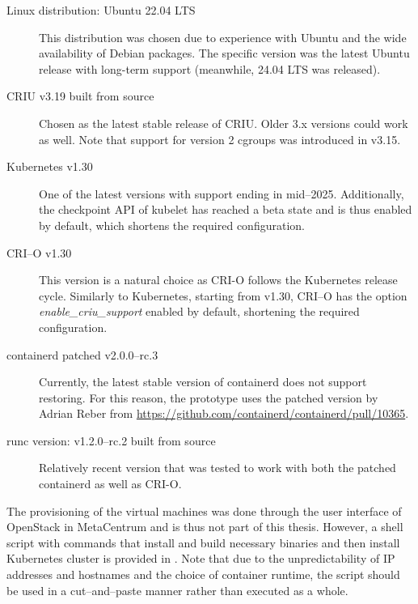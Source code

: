\documentclass[
  digital,     %
  oneside,     %
  nosansbold,  %
  nocolorbold, %
  lof,         %
  nolot,         %
]{fithesis4}
\begin{document}
\begin{description}
    \item[Linux distribution: Ubuntu 22.04 LTS] This distribution was chosen due to experience with Ubuntu and the wide availability of Debian packages. The specific version was the latest Ubuntu release with long-term support (meanwhile, 24.04 LTS was released).
    
    \item[CRIU v3.19 built from source] Chosen as the latest stable release of CRIU. Older 3.x versions could work as well. Note that support for version 2 cgroups was introduced in v3.15.
    
    \item[Kubernetes v1.30] One of the latest versions with support ending in mid--2025. Additionally, the checkpoint API of kubelet has reached a beta state and is thus enabled by default, which shortens the required configuration.

    \item[CRI--O v1.30] This version is a natural choice as CRI-O follows the Kubernetes release cycle. Similarly to Kubernetes, starting from v1.30, CRI--O has the option \emph{enable\_criu\_support} enabled by default, shortening the required configuration.
        
    \item[containerd patched v2.0.0--rc.3] Currently, the latest stable version of containerd does not support restoring. For this reason, the prototype uses the patched version by Adrian Reber from \url{https://github.com/containerd/containerd/pull/10365}.

    \item[runc version: v1.2.0--rc.2 built from source] Relatively recent version that was tested to work with both the patched containerd as well as CRI-O. %

\end{description}

The provisioning of the virtual machines was done through the user interface of OpenStack in MetaCentrum and is thus not part of this thesis. However, a shell script with commands that install and build necessary binaries and then install Kubernetes cluster is provided in . Note that due to the unpredictability of IP addresses and hostnames and the choice of container runtime, the script should be used in a cut--and--paste manner rather than executed as a whole.
\end{document}
